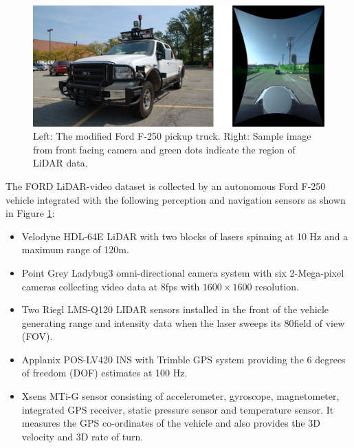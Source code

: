 \documentclass{article}
\begin{document}
\begin{figure}[htbp]
    \centering
        \includegraphics[scale=0.45]{Figures/ford-truck-sensors-final.png}
    \caption{Left: The modified Ford F-250 pickup truck. Right: Sample image from front facing camera and green dots indicate the region of LiDAR data.}
    \label{fig:ford-truck-sensors}
\end{figure}

The FORD LiDAR-video dataset \cite{Pandey2011Ford-Campu} is collected by an autonomous Ford F-250 vehicle integrated with the following perception and navigation sensors as shown in Figure \ref{fig:ford-truck-sensors}:
\begin{itemize}
    \item Velodyne HDL-64E LiDAR with two blocks of lasers spinning at 10 Hz and a maximum range of 120m.
    \item Point Grey Ladybug3 omni-directional camera system with six 2-Mega-pixel cameras collecting video data at 8fps with $1600\times1600$ resolution.
    \item Two Riegl LMS-Q120 LIDAR sensors installed in the front of the vehicle generating range and intensity data when the laser sweeps its 80\degree field of view (FOV).
    \item Applanix POS-LV420 INS with Trimble GPS system providing the 6 degrees of freedom (DOF) estimates at 100 Hz.
    \item Xsens MTi-G sensor consisting of accelerometer, gyroscope, magnetometer, integrated GPS receiver, static pressure sensor and temperature sensor. It measures the GPS co-ordinates of the vehicle and also provides the 3D velocity and 3D rate of turn.
\end{itemize}
\end{document}

